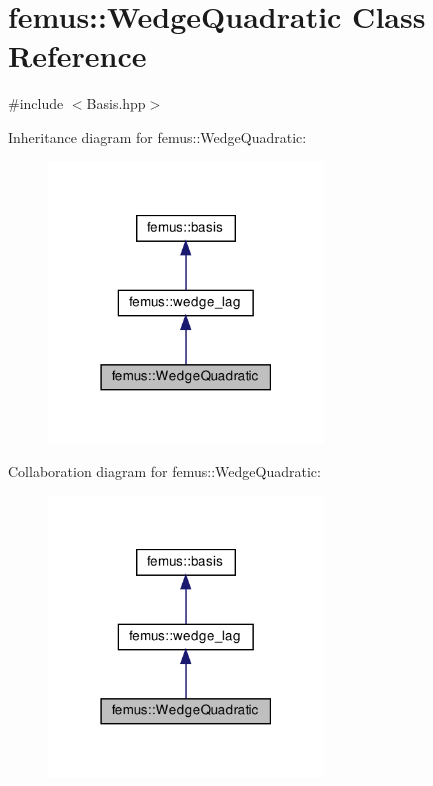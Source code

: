 \hypertarget{classfemus_1_1_wedge_quadratic}{}\section{femus\+:\+:Wedge\+Quadratic Class Reference}
\label{classfemus_1_1_wedge_quadratic}


{\ttfamily \#include $<$Basis.\+hpp$>$}



Inheritance diagram for femus\+:\+:Wedge\+Quadratic\+:
\nopagebreak
\begin{figure}[H]
\begin{center}
\leavevmode
\includegraphics[width=207pt]{classfemus_1_1_wedge_quadratic__inherit__graph}
\end{center}
\end{figure}


Collaboration diagram for femus\+:\+:Wedge\+Quadratic\+:
\nopagebreak
\begin{figure}[H]
\begin{center}
\leavevmode
\includegraphics[width=207pt]{classfemus_1_1_wedge_quadratic__coll__graph}
\end{center}
\end{figure}
